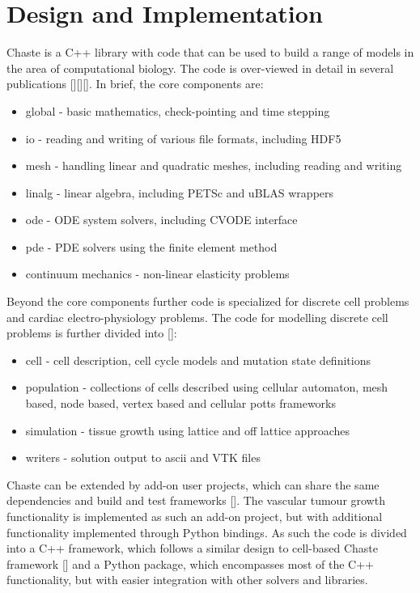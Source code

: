 \documentclass[superscriptaddress, a4paper]{article}
\begin{document}
\section{Design and Implementation}
\label{sec:design and implementation}

Chaste is a C++ library with code that can be used to build a range of models in the area of computational biology. The code is over-viewed in detail in several publications [][][]. In brief, the core components are:

\begin{itemize}
 \item global - basic mathematics, check-pointing and time stepping
 \item io - reading and writing of various file formats, including HDF5
 \item mesh - handling linear and quadratic meshes, including reading and writing
 \item linalg - linear algebra, including PETSc and uBLAS wrappers
 \item ode - ODE system solvers, including CVODE interface
 \item pde - PDE solvers using the finite element method
 \item continuum mechanics - non-linear elasticity problems
\end{itemize}

Beyond the core components further code is specialized for discrete cell problems and cardiac electro-physiology problems. The code for modelling discrete cell problems is further divided into []:

\begin{itemize}
 \item cell - cell description, cell cycle models and mutation state definitions
 \item population - collections of cells described using cellular automaton, mesh based, node based, vertex based and cellular potts frameworks
 \item simulation - tissue growth using lattice and off lattice approaches
 \item writers - solution output to ascii and VTK files
\end{itemize}

Chaste can be extended by add-on user projects, which can share the same dependencies and build and test frameworks []. The vascular tumour growth functionality is implemented as such an add-on project, but with additional functionality implemented through Python bindings. As such the code is divided into a C++ framework, which follows a similar design to cell-based Chaste framework [] and a Python package, which encompasses most of the C++ functionality, but with easier integration with other solvers and libraries. 
\end{document}
